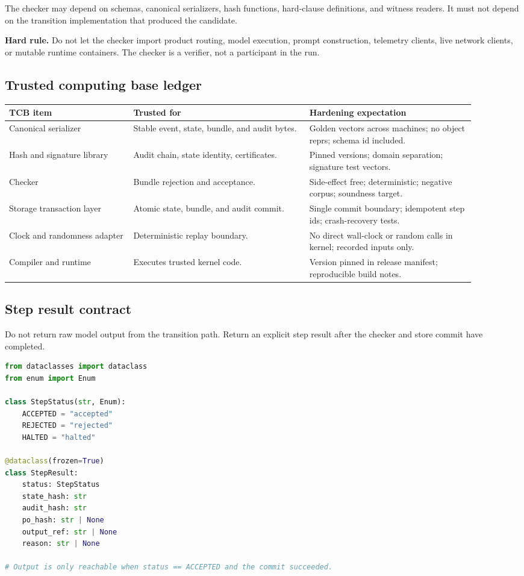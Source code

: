 \documentclass[11pt,oneside]{article}
\newenvironment{rulebox}{\begin{shaded}\noindent\textbf{Hard rule.} }{\end{shaded}}
\begin{document}
The checker may depend on schemas, canonical serializers, hash functions, hard-clause definitions, and witness readers. It must not depend on the transition implementation that produced the candidate.

\begin{rulebox}
Do not let the checker import product routing, model execution, prompt construction, telemetry clients, live network clients, or mutable runtime containers. The checker is a verifier, not a participant in the run.
\end{rulebox}

\subsection{Trusted computing base ledger}
\begin{longtable}{@{}p{0.24\linewidth}p{0.34\linewidth}p{0.32\linewidth}@{}}
\toprule
\textbf{TCB item} & \textbf{Trusted for} & \textbf{Hardening expectation} \\
\midrule
Canonical serializer & Stable event, state, bundle, and audit bytes. & Golden vectors across machines; no object reprs; schema id included. \\
Hash and signature library & Audit chain, state identity, certificates. & Pinned versions; domain separation; signature test vectors. \\
Checker & Bundle rejection and acceptance. & Side-effect free; deterministic; negative corpus; soundness target. \\
Storage transaction layer & Atomic state, bundle, and audit commit. & Single commit boundary; idempotent step ids; crash-recovery tests. \\
Clock and randomness adapter & Deterministic replay boundary. & No direct wall-clock or random calls in kernel; recorded inputs only. \\
Compiler and runtime & Executes trusted kernel code. & Version pinned in release manifest; reproducible build notes. \\
\bottomrule
\end{longtable}

\subsection{Step result contract}
Do not return raw model output from the transition path. Return an explicit step result after the checker and store commit have completed.

\begin{lstlisting}[language=Python,caption={Hardened step result contract.}]
from dataclasses import dataclass
from enum import Enum

class StepStatus(str, Enum):
    ACCEPTED = "accepted"
    REJECTED = "rejected"
    HALTED = "halted"

@dataclass(frozen=True)
class StepResult:
    status: StepStatus
    state_hash: str
    audit_hash: str
    po_hash: str | None
    output_ref: str | None
    reason: str | None

# Output is only reachable when status == ACCEPTED and the commit succeeded.
\end{lstlisting}
\end{document}
